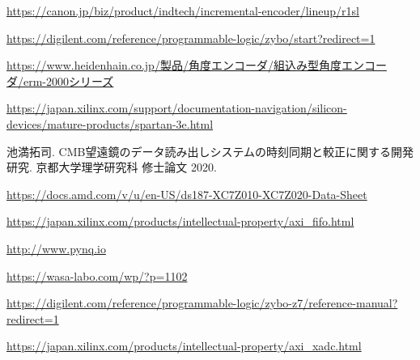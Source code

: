 \begin{thebibliography}{99}


\href{https://canon.jp/biz/product/indtech/incremental-encoder/lineup/r1sl}{https://canon.jp/biz/product/indtech/incremental-encoder/lineup/r1sl}

\href{https://digilent.com/reference/programmable-logic/zybo/start?redirect=1}{https://digilent.com/reference/programmable-logic/zybo/start?redirect=1}

\href{https://www.heidenhain.co.jp/製品/角度エンコーダ/組込み型角度エンコーダ/erm-2000シリーズ}{https://www.heidenhain.co.jp/製品/角度エンコーダ/組込み型角度エンコーダ/erm-2000シリーズ}

\href{https://japan.xilinx.com/support/documentation-navigation/silicon-devices/mature-products/spartan-3e.html}{
https://japan.xilinx.com/support/documentation-navigation/silicon-devices/mature-products/spartan-3e.html}

池満拓司. CMB望遠鏡のデータ読み出しシステムの時刻同期と較正に関する開発研究. 京都大学理学研究科 修士論文 2020.

\href{https://docs.amd.com/v/u/en-US/ds187-XC7Z010-XC7Z020-Data-Sheet}{https://docs.amd.com/v/u/en-US/ds187-XC7Z010-XC7Z020-Data-Sheet}

\href{https://japan.xilinx.com/products/intellectual-property/axi\_fifo.html}{https://japan.xilinx.com/products/intellectual-property/axi\_fifo.html}

\href{http://www.pynq.io}{http://www.pynq.io}

\href{https://wasa-labo.com/wp/?p=1102}{https://wasa-labo.com/wp/?p=1102}

\href{https://digilent.com/reference/programmable-logic/zybo-z7/reference-manual?redirect=1}{https://digilent.com/reference/programmable-logic/zybo-z7/reference-manual?redirect=1}

\href{https://japan.xilinx.com/products/intellectual-property/axi\_xadc.html}{https://japan.xilinx.com/products/intellectual-property/axi\_xadc.html}



\end{thebibliography}
